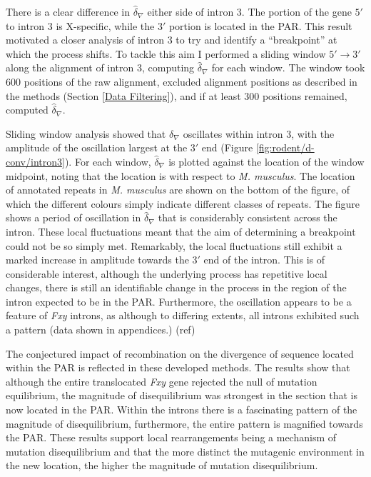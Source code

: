 

There is a clear difference in $\hat \delta_\nabla$ either side of intron 3. The portion of the gene $5'$ to intron 3 is X-specific, while the $3'$ portion is located in the PAR. This result motivated a closer analysis of intron 3 to try and identify a ``breakpoint'' at which the process shifts. To tackle this aim I performed a sliding window $5' \rightarrow 3'$ along the alignment of intron 3, computing $\hat \delta_\nabla$ for each window. The window took $600$ positions of the raw alignment, excluded alignment positions as described in the methods (Section \ref{Data Filtering}), and if at least 300 positions remained, computed $\hat \delta_\nabla$. 

Sliding window analysis showed that $\delta_\nabla$ oscillates within intron 3, with the amplitude of the oscillation largest at the $3'$ end (Figure \ref{fig:rodent/d-conv/intron3}). For each window, $\hat \delta_\nabla$ is plotted against the location of the window midpoint, noting that the location is with respect to \textit{M. musculus}. The location of annotated repeats in \textit{M. musculus} are shown on the bottom of the figure, of which the different colours simply indicate different classes of repeats. The figure shows a period of oscillation in $\hat \delta_\nabla$ that is considerably consistent across the intron. These local fluctuations meant that the aim of determining a breakpoint could not be so simply met. Remarkably, the local fluctuations still exhibit a marked increase in amplitude towards the $3'$ end of the intron. This is of considerable interest, although the underlying process has repetitive local changes, there is still an identifiable change in the process in the region of the intron expected to be in the PAR. Furthermore, the oscillation appears to be a feature of \textit{Fxy} introns, as although to differing extents, all introns exhibited such a pattern (data shown in appendices.) (ref) 



The conjectured impact of recombination on the divergence of sequence located within the PAR is reflected in these developed methods. The results show that although the entire translocated \textit{Fxy} gene rejected the null of mutation equilibrium, the magnitude of disequilibrium was strongest in the section that is now located in the PAR. Within the introns there is a fascinating pattern of the magnitude of disequilibrium, furthermore, the entire pattern is magnified towards the PAR. These results support local rearrangements being a mechanism of mutation disequilibrium and that the more distinct the mutagenic environment in the new location, the higher the magnitude of mutation disequilibrium.


